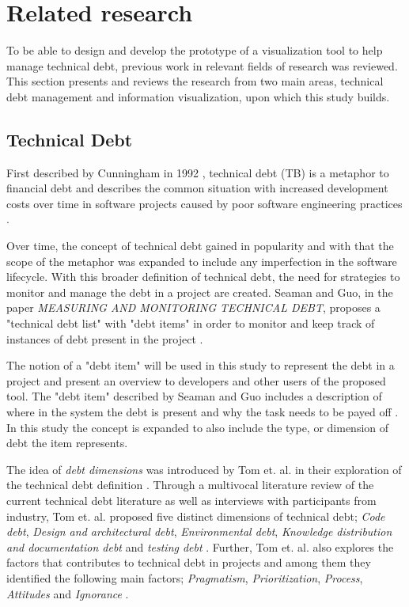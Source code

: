

\section{Related research}

To be able to design and develop the prototype of a visualization tool to help manage technical debt, previous work in relevant fields of research was reviewed.
This section presents and reviews the research from two main areas, technical debt management and information visualization, upon which this study builds.

\subsection{Technical Debt}
First described by Cunningham in 1992 \cite{cunningham_wycash_1992}, technical debt (TB) is a metaphor to financial debt and describes the common situation with increased development costs over time in software projects caused by poor software engineering practices \cite{tom_exploration_2013}.

Over time, the concept of technical debt gained in popularity and with that the scope of the metaphor was expanded to include any imperfection in the software lifecycle.
With this broader definition of technical debt, the need for strategies to monitor and manage the debt in a project are created.
Seaman and Guo, in the paper \textit{MEASURING AND MONITORING TECHNICAL DEBT}, proposes a "technical debt list" with "debt items" in order to monitor and keep track of instances of debt present in the project \cite{seaman_measuring_2011}.

The notion of a "debt item" will be used in this study to represent the debt in a project and present an overview to developers and other users of the proposed tool. 
The "debt item" described by Seaman and Guo includes a description of where in the system the debt is present and why the task needs to be payed off \cite{seaman_measuring_2011}.
In this study the concept is expanded to also include the type, or dimension of debt the item represents.

The idea of \textit{debt dimensions} was introduced by Tom et. al. in their exploration of the technical debt definition \cite{tom_exploration_2013}.
Through a multivocal literature review of the current technical debt literature as well as interviews with participants from industry, Tom et. al. proposed five distinct dimensions of technical debt; \textit{Code debt}, \textit{Design and architectural debt}, \textit{Environmental debt}, \textit{Knowledge distribution and documentation debt} and \textit{testing debt} \cite{tom_exploration_2013}.
Further, Tom et. al. also explores the factors that contributes to technical debt in projects and among them they identified the following main factors; \textit{Pragmatism}, \textit{Prioritization}, \textit{Process}, \textit{Attitudes} and \textit{Ignorance} \cite{tom_exploration_2013}.

